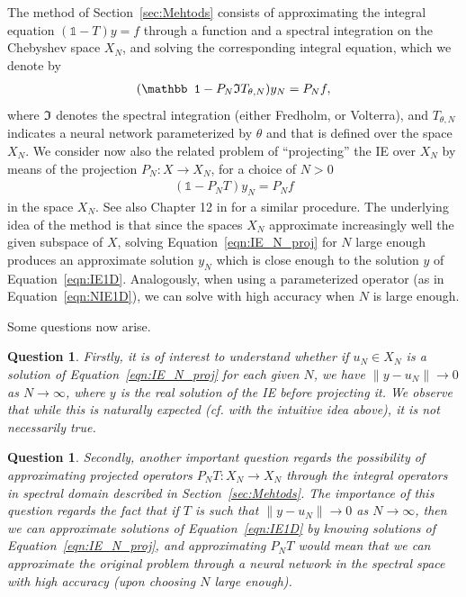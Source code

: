 \documentclass[11pt,fleqn]{amsart} %
\newtheorem{question}[theorem]{Question}
\begin{document}
	The method of Section~\ref{sec:Mehtods} consists of approximating the integral equation $(\mathbb 1 - T)y = f$ through a function and a spectral integration on the Chebyshev space $X_N$, and solving the corresponding integral equation, which we denote by
	\begin{eqnarray}\label{eqn:IE_Cheb_proj}
	(\mathbb 1 - P_N  \frak IT_{\theta, N})y_N = P_N f,
	\end{eqnarray}
	where $\frak I$ denotes the spectral integration (either Fredholm, or Volterra), and $T_{\theta, N}$ indicates a neural network parameterized by $\theta$ and that is defined over the space $X_N$. We consider now also the related problem of ``projecting'' the IE over $X_N$ by means of the projection $P_N : X \longrightarrow X_N$, for a choice of $N >0$
	\begin{eqnarray}\label{eqn:IE_N_proj}
	(\mathbb 1- P_NT) y_N = P_N f
	\end{eqnarray}
	in the space $X_N$. See also Chapter 12 in \cite{Atk-Han} for a similar procedure. The underlying idea of the method is that since the spaces $X_N$ approximate increasingly well the given subspace of $X$, solving Equation~\eqref{eqn:IE_N_proj} for $N$ large enough produces an approximate solution $y_N$ which is close enough to the solution $y$ of Equation~\eqref{eqn:IE1D}. Analogously, when using a parameterized operator (as in Equation~\eqref{eqn:NIE1D}), we can solve with high accuracy when $N$ is large enough.
	
	Some questions now arise.
	\begin{question}\label{question1}
		{\rm 
			Firstly, it is of interest to understand whether if $u_N\in X_N$ is a solution of Equation~\eqref{eqn:IE_N_proj} for each given $N$, we have $\|y - u_N\| \longrightarrow 0$ as $N\longrightarrow \infty$, where $y$ is the real solution of the IE before projecting it. We observe that while this is naturally expected (cf. with the intuitive idea above), it is not necessarily true.
		}
	\end{question} 
	
	\begin{question}\label{question2}
		{\rm
			Secondly, another important question regards the possibility of approximating projected operators $P_NT : X_N \longrightarrow X_N$ through the integral operators in spectral domain described in Section~\ref{sec:Mehtods}.  The importance of this question regards the fact that if $T$ is such that $\|y - u_N\| \longrightarrow 0$ as $N\longrightarrow \infty$, then we can approximate solutions of Equation~\eqref{eqn:IE1D} by knowing solutions of Equation~\eqref{eqn:IE_N_proj}, and approximating $P_NT$ would mean that we can approximate the original problem through a neural network in the spectral space with high accuracy (upon choosing $N$ large enough).
		}
	\end{question} 
	
\end{document}
